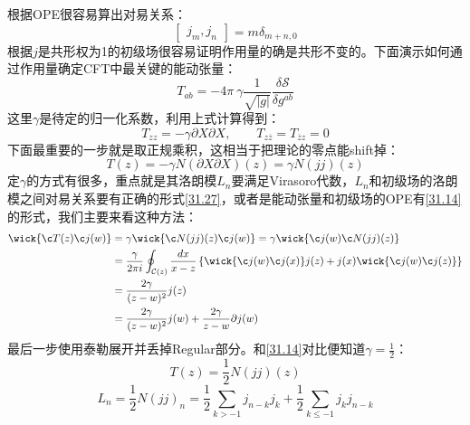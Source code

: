 根据OPE很容易算出对易关系：
\begin{equation}
	\boxed{
		\begin{bmatrix}j_m,j_n\end{bmatrix}= m\delta_{m+n,0}
	}
\end{equation}
根据$j$是共形权为1的初级场很容易证明作用量的确是共形不变的。下面演示如何通过作用量确定CFT中最关键的能动张量：
\begin{equation}
	T_{ab}=-4\pi~\gamma\frac1{\sqrt{|g|}}\frac{\delta\mathcal{S}}{\delta g^{ab}}
\end{equation}
这里$\gamma$是待定的归一化系数，利用上式计算得到：
\begin{equation}
	T_{zz}=-\gamma\partial X\partial X,\quad\quad T_{z\overline{z}}=T_{\overline{z}z}=0
\end{equation}
下面最重要的一步就是取正规乘积，这相当于把理论的零点能shift掉：
\begin{equation}
	T(z)=-\gamma N(\partial X\partial X)(z)=\gamma N(jj)(z)
\end{equation}
定$\gamma$的方式有很多，重点就是其洛朗模$L_n$要满足Virasoro代数，$L_n$和初级场的洛朗模之间对易关系要有正确的形式\ref{31.27}，或者是能动张量和初级场的OPE有\ref{31.14}的形式，我们主要来看这种方法：
\begin{equation}
	\begin{aligned}
		\wick{\c T(z)\c j(w)}&=\gamma \wick{\c N(jj)(z)\c j(w)}=\gamma \wick{\c j(w)\c N(jj)(z)}\\
		&=\frac{\gamma}{2\pi i}\oint_{\mathcal{C}(z)}\frac{dx}{x-z}\left\{\wick{\c j(w)\c j(x)}j(z)+j(x)\wick{\c j(w)\c j(z)}\right\}\\
		&=\frac{2\gamma}{(z-w)^2}j(z)\\
		&=\frac{2\gamma}{(z-w)^2}j(w)+\frac{2\gamma}{z-w}\partial j(w)
	\end{aligned}
\end{equation}
最后一步使用泰勒展开并丢掉Regular部分。和\ref{31.14}对比便知道$\gamma=\frac{1}{2}$：
\begin{equation}
	\boxed{
		T(z)=\frac{1}{2}N(jj)(z)
	}
\end{equation}
\begin{equation}\label{35.14}
	L_n=\frac{1}{2}\left.N(jj)_n=\frac{1}{2}\sum_{k>-1}j_{n-k}\left.j_k+\frac{1}{2}\right.\sum_{k\leq-1}j_k\left.j_{n-k}\right.\right. 
\end{equation}
